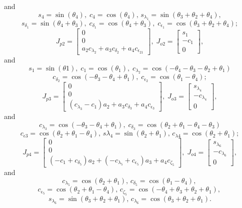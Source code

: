 \documentclass[]{article}
\begin{document}
and \[s_4=\sin(\theta_4),\;c_4=\cos(\theta_4),\, s_{\lambda_{1}}=\sin(\theta_3+\theta_2+\theta_4),\]\[s_{\delta_{1}}=\sin(\theta_4+\theta_3),\;c_{\delta_{1}}=\cos(\theta_4+\theta_3),\;c_{\epsilon_{1}}=\cos(\theta_3+\theta_2+\theta_4);\]
\begin{equation}
	J_{p2}=
	\begin{bmatrix}
	0\\ 0\\ a_{{2}}c_{{\lambda_{{2}}}}+a_{{3}}c_{{\delta_{{2}}}}+a_{{4}}c_{{
			\epsilon_{{21}}}} 
	\end{bmatrix},
	\;J_{o2}=
	\begin{bmatrix}
	s_1\\-c_1\\0
	\end{bmatrix},\nonumber
\end{equation}
and
\[s_1=\sin(\theta1),\;c_1=\cos(\theta_1),\;c_{\lambda_2}=\cos(-\theta_4-\theta_3-\theta_2+\theta_1)\]
\[c_{\delta_{2}}= \cos(-\theta_3-\theta_4+\theta_1),\; c_{\epsilon_2}=\cos(\theta_1-\theta_4);\]
\begin{equation}
	J_{p3}=
	\begin{bmatrix}
		0\\ 0\\
		\left( c_{{\lambda_{{3}}}}-c_{{1}} \right) a_{{2}}+a_{{3}}c_{{\delta_
				{{3}}}}+a_{{4}}c_{{\epsilon_{{3}}}} 
		\end{bmatrix},
	\;J_{o3}=
	\begin{bmatrix}
	s_{{\lambda_{{4}}}}\\ -c_{{\lambda_{{4}}}}\\ 0 
	\end{bmatrix},\nonumber
\end{equation}
and 
\[c_{\lambda_{3}}=\cos(-\theta_3-\theta_4+\theta_1),\; c_{\delta_{3}}=\cos(\theta_2+\theta_1-\theta_4-\theta_3)\] \[c_{\epsilon{3}}=\cos(\theta_2+\theta_1-\theta_4),\,s{\lambda_{4}}=\sin(\theta_2+\theta_1),\,c_{\lambda{4}}=\cos(\theta_2+\theta_1);\]
\begin{equation}
	J_{p4}=
	\begin{bmatrix}
	0\\ 0\\ \left( -c_{{1}}+c_{{\delta_{{5}}}} \right) a_{{2}}+ \left( -c_{{
		\lambda_{{5}}}}+c_{{\epsilon_{{5}}}} \right) a_{{3}}+a_{{4}}c_{{\zeta_
		{{5}}}} 
	\end{bmatrix},\nonumber
	\;J_{o4}=
	\begin{bmatrix}
		s_{{\lambda_{{6}}}}\\ -c_{{\lambda_{{6}}}}\\ 0 
	\end{bmatrix},
\end{equation}
and \[c_{\lambda_{5}}=\cos(\theta_2+\theta_1),\, c_{\delta_{5}}=\cos(\theta_1-\theta_4),\,\]\[c_{\epsilon_{5}}=\cos(\theta_2+\theta_1-\theta_4),\, c_{\zeta_{5}}=\cos(-\theta_4+\theta_3+\theta_2+\theta_1),\,\]\[s_{\lambda_{6}}=\sin(\theta_3+\theta_2+\theta_1),\,c_{\lambda_{6}}=\cos(\theta_3+\theta_2+\theta_1).\]
\end{document}
